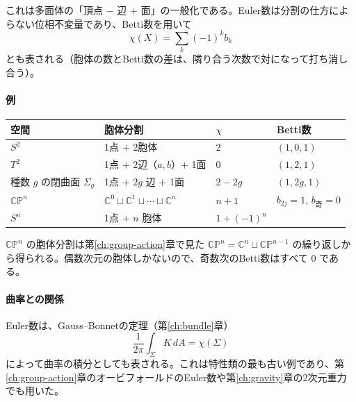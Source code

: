 \documentclass[uplatex, dvipdfmx, book]{jsbook}
\begin{document}
これは多面体の「頂点 $-$ 辺 $+$ 面」の一般化である。Euler数は分割の仕方によらない位相不変量であり、Betti数を用いて
\begin{equation}
    \chi(X) = \sum_k (-1)^k b_k
    \label{eq:euler-betti}
\end{equation}
とも表される（胞体の数とBetti数の差は、隣り合う次数で対になって打ち消し合う）。

\paragraph{例}
\begin{center}
\begin{tabular}{llll}
    \hline
    空間 & 胞体分割 & $\chi$ & Betti数 \\
    \hline
    $S^2$ & 1点 $+$ 2胞体 & $2$ & $(1, 0, 1)$ \\
    $T^2$ & 1点 $+$ 2辺（$a, b$）$+$ 1面 & $0$ & $(1, 2, 1)$ \\
    種数 $g$ の閉曲面 $\Sigma_g$ & 1点 $+$ $2g$ 辺 $+$ 1面 & $2 - 2g$ & $(1, 2g, 1)$ \\
    $\mathbb{CP}^n$ & $\mathbb{C}^0 \sqcup \mathbb{C}^1 \sqcup \cdots \sqcup \mathbb{C}^n$ & $n + 1$ & $b_{2j} = 1$, $b_{\text{奇}} = 0$ \\
    $S^n$ & 1点 $+$ $n$ 胞体 & $1 + (-1)^n$ & \\
    \hline
\end{tabular}
\end{center}
$\mathbb{CP}^n$ の胞体分割は第\ref{ch:group-action}章で見た $\mathbb{CP}^n = \mathbb{C}^n \sqcup \mathbb{CP}^{n-1}$ の繰り返しから得られる。偶数次元の胞体しかないので、奇数次のBetti数はすべて $0$ である。

\paragraph{曲率との関係}
Euler数は、Gauss--Bonnetの定理（第\ref{ch:bundle}章）
\begin{equation}
    \frac{1}{2\pi}\int_\Sigma K\, dA = \chi(\Sigma)
\end{equation}
によって曲率の積分としても表される。これは特性類の最も古い例であり、第\ref{ch:group-action}章のオービフォールドのEuler数や第\ref{ch:gravity}章の2次元重力でも用いた。
\end{document}

